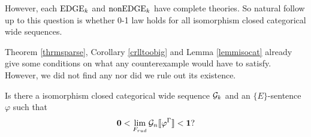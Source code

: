 However, each $\text{EDGE}_k$ and $\text{nonEDGE}_k$ have complete theories. So natural follow up to this question is whether 0-1 law holds for all isomorphism closed categorical wide sequences. 

Theorem \ref{thrmsparse}, Corollary \ref{crlltoobig} and Lemma \ref{lemmisocat} already give some conditions on what any counterexample would have to satisfy. However, we did not find any nor did we rule out its existence. 

\begin{ques}
Is there a isomorphism closed categorical wide sequence $\mathcal{G}_k$ and an $\{E\}$-sentence $\varphi$ such that
\[\textbf{0}<\lim_{F_{rud}}\mathcal{G}_n\llbracket\varphi^\Gamma\rrbracket<\textbf{1}?\]
\end{ques}
